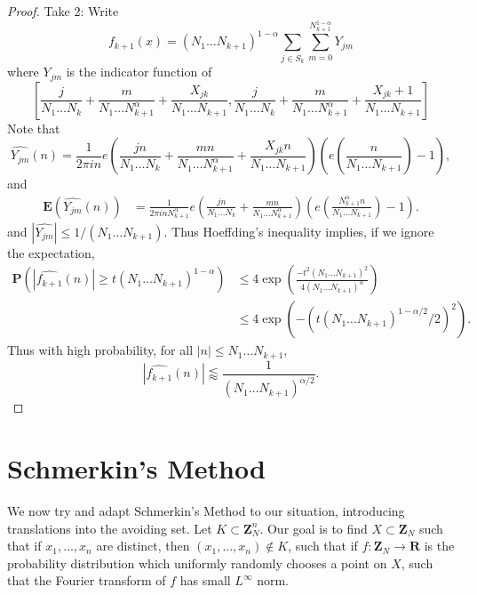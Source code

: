 \begin{proof}
	Take 2: Write
	\[ f_{k+1}(x) = (N_1 \dots N_{k+1})^{1-\alpha} \sum_{j \in S_k} \sum_{m = 0}^{N_{k+1}^{1-\alpha}} Y_{jm} \]
	where $Y_{jm}$ is the indicator function of
	\[ \left[ \frac{j}{N_1 \dots N_k} + \frac{m}{N_1 \dots N_{k+1}^\alpha} + \frac{X_{jk}}{N_1 \dots N_{k+1}}, \frac{j}{N_1 \dots N_k} + \frac{m}{N_1 \dots N_{k+1}^\alpha} + \frac{X_{jk} + 1}{N_1 \dots N_{k+1}} \right] \]
	Note that
	\[ \widehat{Y_{jm}}(n) = \frac{1}{2 \pi i n} e \left( \frac{j n}{N_1 \dots N_k} + \frac{m n}{N_1 \dots N_{k+1}^\alpha} + \frac{X_{jk} n}{N_1 \dots N_{k+1}} \right) \left( e \left( \frac{n}{N_1 \dots N_{k+1}} \right) - 1 \right), \]
	and
	\begin{align*}
		\mathbf{E} \left(\widehat{Y_{jm}}(n) \right) &= \frac{1}{2 \pi i n N_{k+1}^\alpha} e \left( \frac{jn}{N_1 \dots N_k} + \frac{mn}{N_1 \dots N_{k+1}^\alpha} \right) \left( e \left( \frac{ N_{k+1}^\alpha n}{N_1 \dots N_{k+1}} \right) - 1 \right).
	\end{align*}
	and $|\widehat{Y_{jm}}| \leq 1/(N_1 \dots N_{k+1})$. Thus Hoeffding's inequality implies, if we ignore the expectation,
	\begin{align*}
		\mathbf{P} \left( |\widehat{f_{k+1}}(n)| \geq t (N_1 \dots N_{k+1})^{1-\alpha} \right) &\leq 4 \exp \left( \frac{-t^2 (N_1 \dots N_{k+1})^2}{4(N_1 \dots N_{k+1})^\alpha} \right)\\
		&\leq 4 \exp \left( - \left( t (N_1 \dots N_{k+1})^{1 - \alpha/2} / 2 \right)^2 \right).
	\end{align*}
	Thus with high probability, for all $|n| \leq N_1 \dots N_{k+1}$,
	\[ |\widehat{f_{k+1}}(n)| \lessapprox \frac{1}{(N_1 \dots N_{k+1})^{\alpha/2}}. \]
\end{proof}




\section{Schmerkin's Method}

We now try and adapt Schmerkin's Method to our situation, introducing translations into the avoiding set. Let $K \subset \mathbf{Z}_N^n$. Our goal is to find $X \subset \mathbf{Z}_N$ such that if $x_1, \dots, x_n$ are distinct, then $(x_1, \dots, x_n) \not \in K$, such that if $f: \mathbf{Z}_N \to \mathbf{R}$ is the probability distribution which uniformly randomly chooses a point on $X$, such that the Fourier transform of $f$ has small $L^\infty$ norm.

